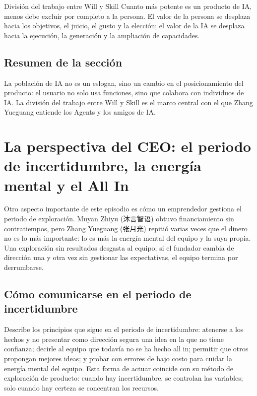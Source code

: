 \documentclass[a4paper]{article}
\begin{document}
\begin{importantbox}{División del trabajo entre Will y Skill}
Cuanto más potente es un producto de IA, menos debe excluir por completo a la persona. El valor de la persona se desplaza hacia los objetivos, el juicio, el gusto y la elección; el valor de la IA se desplaza hacia la ejecución, la generación y la ampliación de capacidades.
\end{importantbox}

\subsection{Resumen de la sección}

La población de IA no es un eslogan, sino un cambio en el posicionamiento del producto: el usuario no solo usa funciones, sino que colabora con individuos de IA. La división del trabajo entre Will y Skill es el marco central con el que Zhang Yueguang entiende los Agents y los amigos de IA.
\section{La perspectiva del CEO: el periodo de incertidumbre, la energía mental y el All In}

Otro aspecto importante de este episodio es cómo un emprendedor gestiona el periodo de exploración. Muyan Zhiyu (沐言智语) obtuvo financiamiento sin contratiempos, pero Zhang Yueguang (张月光) repitió varias veces que el dinero no es lo más importante: lo es más la energía mental del equipo y la suya propia. Una exploración sin resultados desgasta al equipo; si el fundador cambia de dirección una y otra vez sin gestionar las expectativas, el equipo termina por derrumbarse.

\subsection{Cómo comunicarse en el periodo de incertidumbre}

Describe los principios que sigue en el periodo de incertidumbre: atenerse a los hechos y no presentar como dirección segura una idea en la que no tiene confianza; decirle al equipo que todavía no se ha hecho all in; permitir que otros propongan mejores ideas; y probar con errores de bajo costo para cuidar la energía mental del equipo. Esta forma de actuar coincide con su método de exploración de producto: cuando hay incertidumbre, se controlan las variables; solo cuando hay certeza se concentran los recursos.
\end{document}
